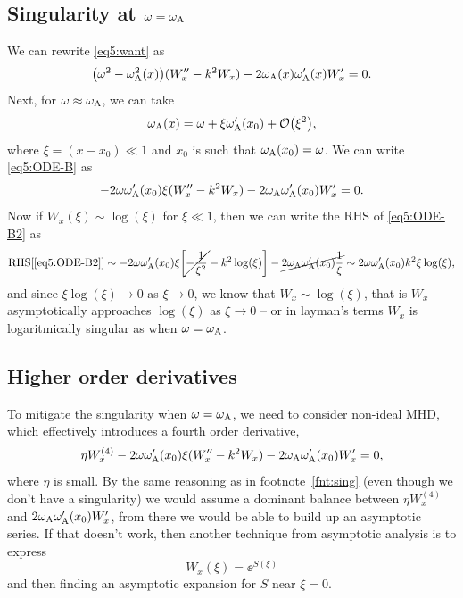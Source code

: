 \documentclass[11pt,a4paper, 
swedish, english %
]{article}
\begin{document}
\subsection{Singularity at $\omega=\omega_{\text{A}}$}
We can rewrite \eqref{eq5:want} as
\begin{equation}\label{eq5:ODE-B}
\qty(\omega^2-\omega_{\text{A}}^2(x))(W_x''-k^2W_x)-2\omega_{\text{A}}(x)\omega_{\text{A}}'(x)W_x'=0.
\end{equation}
Next, for $\omega\approx\omega_{\text{A}}$, we can take
\begin{equation}
\wA(x)=\omega+\xi\wA'(x_0)+\order{\xi^2},
\end{equation}
where $\xi=(x-x_0)\ll1$ and $x_0$ is such that $\omega_{\text{A}}(x_0)=\omega$. We can
write \eqref{eq5:ODE-B} as
\begin{equation}\label{eq5:ODE-B2}
-2\omega\omega_{\text{A}}'(x_0)\xi(W_x''-k^2W_x)-2\omega_{\text{A}}\omega_{\text{A}}'(x_0)W_x'=0.
\end{equation}
Now if\footnotemark{} $W_x(\xi)\sim\log(\xi)$ for $\xi\ll1$, then we
can write the RHS of \eqref{eq5:ODE-B2} as
\begin{equation}
\text{RHS[\eqref{eq5:ODE-B2}]}\sim
-2\omega\omega_{\text{A}}'(x_0)\xi\qty[\cancel{-\frac{1}{\xi^2}}-k^2\log(\xi)]
-\cancel{2\omega_{\text{A}}\omega_{\text{A}}'(x_0)\frac{1}{\xi}}
\sim2\omega\omega_{\text{A}}'(x_0)k^2\xi\log(\xi),
\end{equation}
and since $\xi\log(\xi)\to0$ as $\xi\to0$, we know that
$W_x\sim\log(\xi)$, that is $W_x$ asymptotically approaches
$\log(\xi)$ as $\xi\to0$ -- or in layman's terms $W_x$ is
logaritmically singular as when $\omega=\omega_{\text{A}}$.

\subsection{Higher order derivatives}
To mitigate the singularity when $\omega=\omega_{\text{A}}$, we need to consider
non-ideal MHD, which effectively introduces a fourth order derivative,
\begin{equation}
\eta W_x^{(4)}-2\omega\omega_{\text{A}}'(x_0)\xi(W_x''-k^2W_x)-2\omega_{\text{A}}\omega_{\text{A}}'(x_0)W_x'=0,
\end{equation}
where $\eta$ is small. By the same reasoning as in
footnote~\ref{fnt:sing} (even though we don't have a singularity) we
would assume a dominant balance between $\eta W_x^{(4)}$ and
$2\omega_{\text{A}}\omega_{\text{A}}'(x_0)W_x'$, from there we would be able to build up an
asymptotic series. If that doesn't work, then another technique from
asymptotic analysis is to express
\begin{equation}
W_x(\xi)=\ee^{S(\xi)}
\end{equation}
and then finding an asymptotic expansion for $S$ near $\xi=0$.

\end{document}
